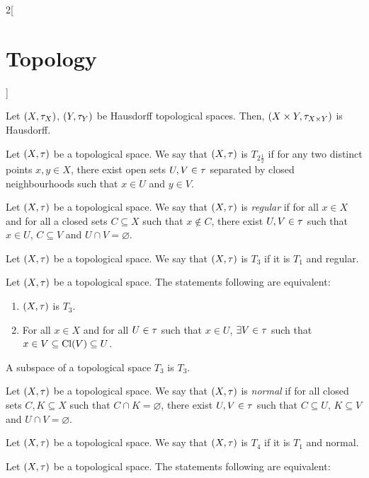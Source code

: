 \documentclass[../../../main.tex]{subfiles}
\begin{document}
\begin{multicols}{2}[\section{Topology}]
\begin{prop}
    Let $(X,\tau_X)$, $(Y,\tau_Y)$ be Hausdorff topological spaces. Then, $(X\times Y,\tau_{X\times Y})$ is Hausdorff.
  \end{prop}
  \begin{definition}
    Let $(X,\tau)$ be a topological space. We say that $(X,\tau)$ is $T_{2\frac{1}{2}}$ if for any two distinct points $x,y\in X$, there exist open sets $U,V\in\tau$ separated by closed neighbourhoods such that $x\in U$ and $y\in V$.
  \end{definition}
  \begin{definition}
    Let $(X,\tau)$ be a topological space. We say that $(X,\tau)$ is \emph{regular} if for all $x\in X$ and for all a closed sets $C\subseteq X$ such that $x\notin C$, there exist $U,V\in\tau$ such that $x\in U$, $C\subseteq V$ and $U\cap V=\varnothing$.
  \end{definition}
  \begin{definition}[$T_3$ space]
    Let $(X,\tau)$ be a topological space. We say that $(X,\tau)$ is $T_3$ if it is $T_1$ and regular.
  \end{definition}
  \begin{theorem}
    Let $(X,\tau)$ be a topological space. The statements following are equivalent:
    \begin{enumerate}
      \item $(X,\tau)$ is $T_3$.
      \item For all $x\in X$ and for all $U\in\tau$ such that $x\in U$, $\exists V\in\tau$ such that $x\in V\subseteq\operatorname{Cl}(V)\subseteq U$.
    \end{enumerate}
  \end{theorem}
  \begin{theorem}
    A subspace of a topological space $T_3$ is $T_3$.
  \end{theorem}
  \begin{definition}
    Let $(X,\tau)$ be a topological space. We say that $(X,\tau)$ is \emph{normal} if for all closed sets $C,K\subseteq X$ such that $C\cap K=\varnothing$, there exist $U,V\in\tau$ such that $C\subseteq U$, $K\subseteq V$ and $U\cap V=\varnothing$.
  \end{definition}
  \begin{definition}[$T_4$ space]
    Let $(X,\tau)$ be a topological space. We say that $(X,\tau)$ is $T_4$ if it is $T_1$ and normal.
  \end{definition}
  \begin{theorem}
    Let $(X,\tau)$ be a topological space. The statements following are equivalent:

\end{theorem}
\end{multicols}
\end{document}
